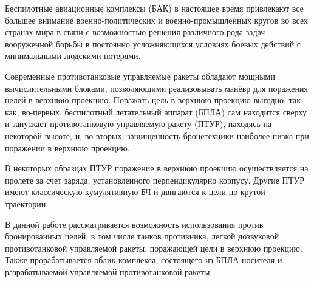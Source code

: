\Introduction

Беспилотные авиационные комплексы (БАК) в настоящее время привлекают все большее внимание военно-политических и военно-промышленных кругов во всех странах мира в связи с возможностью решения различного рода задач вооруженной борьбы в постоянно усложняющихся условиях боевых действий с минимальными людскими потерями.


Современные противотанковые управляемые ракеты обладают мощными вычислительными блоками, позволяющими реализовывать манёвр для поражения целей в верхнюю проекцию. Поражать цель в верхнюю проекцию выгодно, так как, во-первых, беспилотный летательный аппарат (БПЛА) сам находится сверху и запускает противотанковую управляемую ракету (ПТУР), находясь на некоторой высоте, и, во-вторых, защищенность бронетехники наиболее низка при поражении в верхнюю проекцию.


В некоторых образцах ПТУР поражение в верхнюю проекцию осуществляется на пролете за счет заряда, установленного перпендикулярно корпусу. Другие ПТУР имеют классическую кумулятивную БЧ и двигаются к цели по крутой траектории.


В данной работе рассматривается возможность использования против бронированных целей, в том числе танков противника, легкой дозвуковой противотанковой управляемой ракеты, поражающей цели в верхнюю проекцию. Также прорабатывается облик комплекса, состоящего из БПЛА-носителя и разрабатываемой управляемой противотанковой ракеты.

